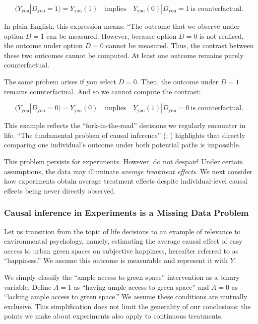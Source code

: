 \documentclass[
  singlecolumn]{article}
\begin{document}
\[
(Y_{\text{you}}|D_{\text{you}} = 1) = Y_{\text{you}}(1) \quad \text{implies} \quad Y_{\text{you}}(0)|D_{\text{you}} = 1~ \text{is counterfactual}.
\]

In plain English, this expression means: ``The outcome that we observe
under option \(D = 1\) can be measured. However, because option
\(D = 0\) is not realised, the outcome under option \(D=0\) cannot be
measured. Thus, the contrast between these two outcomes cannot be
computed. At least one outcome remains purely counterfactual.

The same probem arises if you select \(D = 0\). Then, the outcome under
\(D=1\) remains counterfactual. And so we cannot compute the contrast:

\[
(Y_{\text{you}}|D_{\text{you}} = 0) = Y_{\text{you}}(0) \quad \text{implies} \quad Y_{\text{you}}(1)|D_{\text{you}} = 0~ \text{is counterfactual}.
\]

This example reflects the ``fork-in-the-road'' decisions we regularly
encounter in life. ``The fundamental problem of causal inference''
(;
) highlights that directly comparing
one individual's outcome under both potential paths is impossible.

This problem persists for experiments. However, do not despair! Under
certain assumptions, the data may illuminate \emph{average treatment
effects}. We next consider how experiments obtain average treatment
effects despite individual-level causal effects being never directly
observed.

\subsubsection{Causal inference in Experiments is a Missing Data
Problem}\label{causal-inference-in-experiments-is-a-missing-data-problem}

Let us transition from the topic of life decisions to an example of
relevance to environmental psychology, namely, estimating the average
causal effect of easy access to urban green spaces on subjective
happiness, hereafter referred to as ``happiness.'' We assume this
outcome is measurable and represent it with \(Y\).

We simply classify the ``ample access to green space'' intervention as a
binary variable. Define \(A = 1\) as ``having ample access to green
space'' and \(A = 0\) as ``lacking ample access to green space.'' We
assume these conditions are mutually exclusive. This simplification does
not limit the generality of our conclusions; the points we make about
experiments also apply to continuous treatments.
\end{document}
